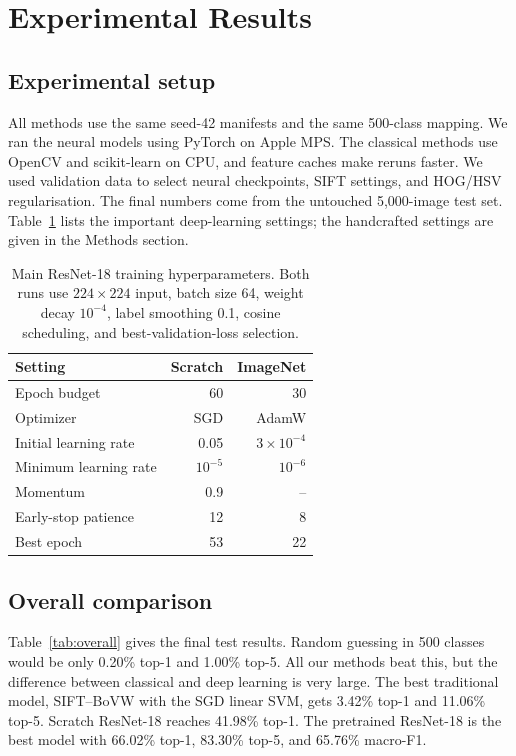 \documentclass[10pt,twocolumn,letterpaper]{article}
\begin{document}
\section{Experimental Results}
\subsection{Experimental setup}
All methods use the same seed-42 manifests and the same 500-class mapping.  We ran the neural models using PyTorch on Apple MPS.  The classical methods use OpenCV and scikit-learn on CPU, and feature caches make reruns faster.  We used validation data to select neural checkpoints, SIFT settings, and HOG/HSV regularisation.  The final numbers come from the untouched 5,000-image test set.  Table~\ref{tab:hyperparameters} lists the important deep-learning settings; the handcrafted settings are given in the Methods section.

\begin{table}[t]
\centering
\caption{Main ResNet-18 training hyperparameters.  Both runs use $224\times224$ input, batch size 64, weight decay $10^{-4}$, label smoothing 0.1, cosine scheduling, and best-validation-loss selection.}
\label{tab:hyperparameters}
\small
\setlength{\tabcolsep}{4.2pt}
\begin{tabular}{lrr}
\toprule
Setting & Scratch & ImageNet \\
\midrule
Epoch budget & 60 & 30 \\
Optimizer & SGD & AdamW \\
Initial learning rate & 0.05 & $3\times10^{-4}$ \\
Minimum learning rate & $10^{-5}$ & $10^{-6}$ \\
Momentum & 0.9 & -- \\
Early-stop patience & 12 & 8 \\
Best epoch & 53 & 22 \\
\bottomrule
\end{tabular}
\end{table}

\subsection{Overall comparison}
Table~\ref{tab:overall} gives the final test results.  Random guessing in 500 classes would be only 0.20\% top-1 and 1.00\% top-5.  All our methods beat this, but the difference between classical and deep learning is very large.  The best traditional model, SIFT--BoVW with the SGD linear SVM, gets 3.42\% top-1 and 11.06\% top-5.  Scratch ResNet-18 reaches 41.98\% top-1.  The pretrained ResNet-18 is the best model with 66.02\% top-1, 83.30\% top-5, and 65.76\% macro-F1.
\end{document}
